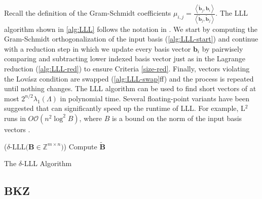 Recall the definition of the Gram-Schmidt coefficients $\mu_{i, j} = \frac{\left\langle \tilde{\mathbf{b}}_j, \mathbf{b}_i\right\rangle}{\left\langle \tilde{\mathbf{b}}_j, \tilde{\mathbf{b}}_j\right\rangle}$. The LLL algorithm shown in \cref{alg:LLL} follows the notation in \cite{LLLReg04}. We start by computing the Gram-Schmidt orthogonalization of the input basis (\cref{alg:LLL-start}) and continue with a reduction step in which we update every basis vector $\mathbf{b}_i$ by pairwisely comparing and subtracting lower indexed basis vector just as in the Lagrange reduction (\cref{alg:LLL-red}) to ensure Criteria \ref{size-red}. Finally, vectors violating the Lovász condition are swapped (\cref{alg:LLL-swap}ff) and the process is repeated until nothing changes. The LLL algorithm can be used to find short vectors of at most $2^{n/2} \lambda_1(\Lambda)$ in polynomial time. Several floating-point variants have been suggested that can significantly speed up the runtime of LLL. For example, L$^2$ runs in $O\mathcal{O}(n^2 \log^2 B)$, where $B$ is a bound on the norm of the input basis vectors \cite{NS05}. %

\begin{algorithm2e}
\Begin($\delta\text{-LLL} {(}\mathbf{B} \in \mathbb{Z}^{m\times n} {)}$) %
{
  Compute $\tilde{\mathbf{B}}$\label{alg:LLL-start}\\
}
\caption{The $\delta$-LLL Algorithm} \label{alg:LLL}
\end{algorithm2e}



\subsection{BKZ}


